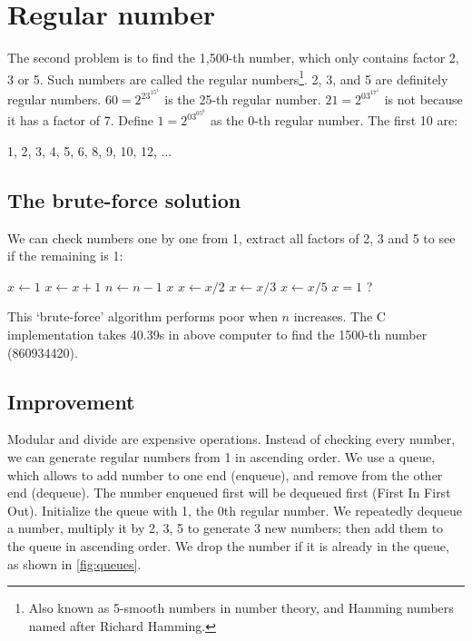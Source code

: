 \documentclass[b5paper]{article}
\begin{document}
\section*{Regular number}

The second problem is to find the 1,500-th number, which only contains factor 2, 3 or 5. Such numbers are called the regular numbers\footnote{Also known as 5-smooth numbers in number theory, and Hamming numbers named after Richard Hamming.}. 2, 3, and 5 are definitely regular numbers. $60 = 2^23^15^1$ is the 25-th regular number. $21 = 2^03^17^1$ is not because it has a factor of 7. Define $1=2^03^05^0$ as the 0-th regular number. The first 10 are:

1, 2, 3, 4, 5, 6, 8, 9, 10, 12, ...

\subsection*{The brute-force solution}
We can check numbers one by one from 1, extract all factors of 2, 3 and 5 to see if the remaining is 1:

\begin{algorithmic}[1]
  \State $x \gets 1$
    \State $x \gets x + 1$
      \State $n \gets n - 1$
    \EndIf
  \EndWhile
  \State \Return $x$
\EndFunction
\Statex
{}
    \State $x \gets x / 2$
  \EndWhile
    \State $x \gets x / 3$
  \EndWhile
    \State $x \gets x / 5$
  \EndWhile
  \State \Return $x = 1$ ?
\EndFunction
\end{algorithmic}

This `brute-force' algorithm performs poor when $n$ increases. The C implementation takes 40.39s in above computer to find the 1500-th number (860934420).

\subsection*{Improvement}
Modular and divide are expensive operations\cite{Bentley}. Instead of checking every number, we can generate regular numbers from 1 in ascending order. We use a queue, which allows to add number to one end (enqueue), and remove from the other end (dequeue). The number enqueued first will be dequeued first (First In First Out). Initialize the queue with 1, the 0th regular number. We repeatedly dequeue a number, multiply it by 2, 3, 5 to generate 3 new numbers; then add them to the queue in ascending order. We drop the number if it is already in the queue, as shown in \cref{fig:queues}.
\end{document}
